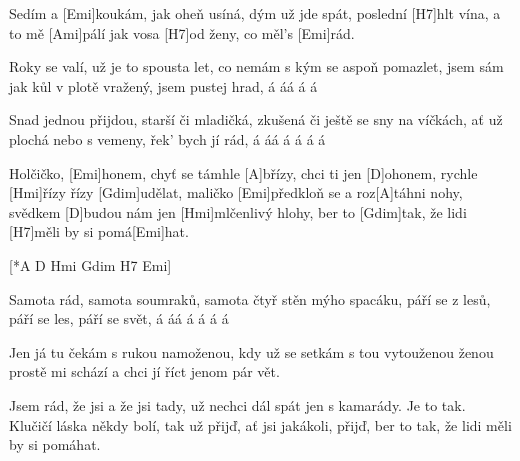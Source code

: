 
\sloka
Sedím a [Emi]koukám, jak oheň usíná,
dým už jde spát, poslední [H7]hlt vína,
a to mě [Ami]pálí jak vosa [H7]od ženy,
co měl’s [Emi]rád.

\sloka
Roky se valí, už je to spousta let,
co nemám s kým se aspoň pomazlet,
jsem sám jak kůl v plotě vražený,
jsem pustej hrad, á áá á á

\sloka
Snad jednou přijdou, starší či mladičká,
zkušená či ještě se sny na víčkách,
ať už plochá nebo s vemeny,
řek’ bych jí rád, á áá á á á á

\hvezda
Holčičko, [Emi]honem, chyť se támhle [A]břízy,
chci ti jen [D]ohonem, rychle [Hmi]řízy řízy [Gdim]udělat,
maličko [Emi]předkloň se a roz[A]táhni nohy,
svědkem [D]budou nám jen [Hmi]mlčenlivý hlohy,
ber to [Gdim]tak, že lidi [H7]měli by si pomá[Emi]hat.

[*A D Hmi Gdim H7 Emi]

\sloka
Samota rád, samota soumraků,
samota čtyř stěn mýho spacáku,
páří se z lesů, páří se les,
páří se svět, á áá á á á á

\sloka
Jen já tu čekám s rukou namoženou,
kdy už se setkám s tou vytouženou ženou
prostě mi schází a chci jí říct
jenom pár vět.

\hvezda
Jsem rád, že jsi a že jsi tady,
už nechci dál spát jen s kamarády.
Je to tak.
Klučičí láska někdy bolí,
tak už přijď, ať jsi jakákoli,
přijď, ber to tak, že lidi měli by si pomáhat.
